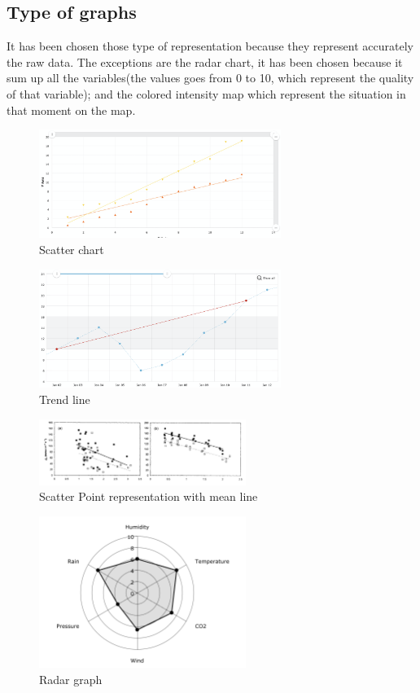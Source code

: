 \documentclass[12pt]{article} %
\begin{document}
\subsection{Type of graphs}
It has been chosen those type of representation because they represent accurately the raw data. The exceptions are the radar chart, it has been chosen because it sum up all the variables(the values goes from 0 to 10, which represent the quality of that variable); and the colored intensity map which represent the situation in that moment on the map. 
\begin{figure}[H]
  \centering
  \includegraphics[width=0.7\textwidth]{img/scatter_chart.png}
  \caption{Scatter chart}
  \label{fig:boat1}
\end{figure}
\begin{figure}[H]
  \centering
  \includegraphics[width=0.7\textwidth]{img/trend_line.png}
  \caption{Trend line}
  \label{fig:boat1}
\end{figure}
\begin{figure}[H]
  \centering
  \includegraphics[width=0.6\textwidth]{img/point.png}
  \caption{Scatter Point representation with mean line}
  \label{fig:boat1}
\end{figure}
\begin{figure}[H]
  \centering
  \includegraphics[width=0.6\textwidth]{img/dont_know.png}
  \caption{Radar graph}
  \label{fig:boat1}
\end{figure}
\end{document}
